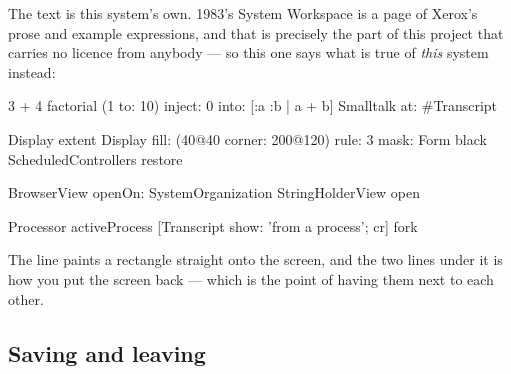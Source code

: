 \begin{description}
The text is this system's own. 1983's System Workspace is a page of Xerox's
prose and example expressions, and that is precisely the part of this project
that carries no licence from anybody --- so this one says what is true of
\emph{this} system instead:

\begin{st}
3 + 4 factorial
(1 to: 10) inject: 0 into: [:a :b | a + b]
Smalltalk at: #Transcript

Display extent
Display fill: (40@40 corner: 200@120) rule: 3 mask: Form black
ScheduledControllers restore

BrowserView openOn: SystemOrganization
StringHolderView open

Processor activeProcess
[Transcript show: 'from a process'; cr] fork
\end{st}

The  line paints a rectangle straight onto the screen, and
the  two lines under it is how you put the
screen back --- which is the point of having them next to each other.

\end{description}

\subsection{Saving and leaving}

